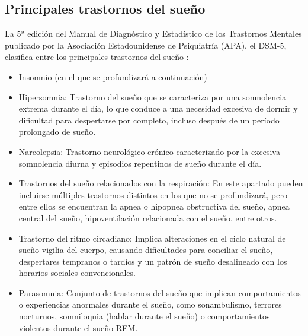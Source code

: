 \documentclass[a4paper,12pt,twoside]{memoir}
\begin{document}
    \subsection {Principales trastornos del sueño}
    \text La 5ª edición del Manual de Diagnóstico y Estadístico de los Trastornos Mentales publicado por la Asociación Estadounidense de Psiquiatría (APA), el DSM-5, clasifica entre los principales trastornos del sueño \cite{guadamuz2022}: 

    \begin{itemize}
    \item Insomnio (en el que se profundizará a continuación)
    \item Hipersomnia: Trastorno del sueño que se caracteriza por una somnolencia extrema durante el día, lo que conduce a una necesidad excesiva de dormir y dificultad para despertarse por completo, incluso después de un período prolongado de sueño.
    \item Narcolepsia: Trastorno neurológico crónico caracterizado por la excesiva somnolencia diurna y episodios repentinos de sueño durante el día.
    \item Trastornos del sueño relacionados con la respiración: En este apartado pueden incluirse múltiples trastornos distintos en los que no se profundizará, pero entre ellos se encuentran la apnea o hipopnea obstructiva del sueño, apnea central del sueño, hipoventilación relacionada con el sueño, entre otros.
    \item Trastorno del ritmo circadiano: Implica alteraciones en el ciclo natural de sueño-vigilia del cuerpo, causando dificultades para conciliar el sueño, despertares tempranos o tardíos y un patrón de sueño desalineado con los horarios sociales convencionales.
    \item Parasomnia: Conjunto de trastornos del sueño que implican comportamientos o experiencias anormales durante el sueño, como sonambulismo, terrores nocturnos, somniloquia (hablar durante el sueño) o comportamientos violentos durante el sueño REM.
    

\end{itemize}
\end{document}
